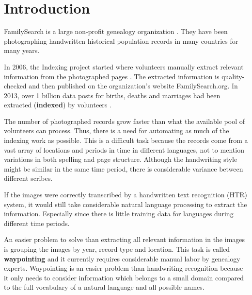 
\section{Introduction}

FamilySearch is a large non-profit genealogy organization \cite{FamilySearchAbout}. They have been photographing handwritten historical population records in many countries for many years.

In 2006, the Indexing project started where volunteers manually extract relevant information from the photographed pages \cite{Indexing}. The extracted information is quality-checked and then published on the organization's website FamilySearch.org. In 2013, over 1 billion data posts for births, deaths and marriages had been extracted (\textbf{indexed}) by volunteers \cite{Billion}.

The number of photographed records grow faster than what the available pool of volunteers can process. Thus, there is a need for automating as much of the indexing work as possible. This is a difficult task because the records come from a vast array of locations and periods in time in different languages, not to mention variations in both spelling and page structure. Although the handwriting style might be similar in the same time period, there is considerable variance between different scribes.

If the images were correctly transcribed by a handwritten text recognition (HTR) system, it would still take considerable natural language processing to extract the information. Especially since there is little training data for languages during different time periods.

An easier problem to solve than extracting all relevant information in the images is grouping the images by year, record type and location. This task is called \textbf{waypointing} \cite{Waypointing} and it currently requires considerable manual labor by genealogy experts.
Waypointing is an easier problem than handwriting recognition because it only needs to consider information which belongs to a small domain compared to the full vocabulary of a natural language and all possible names.

